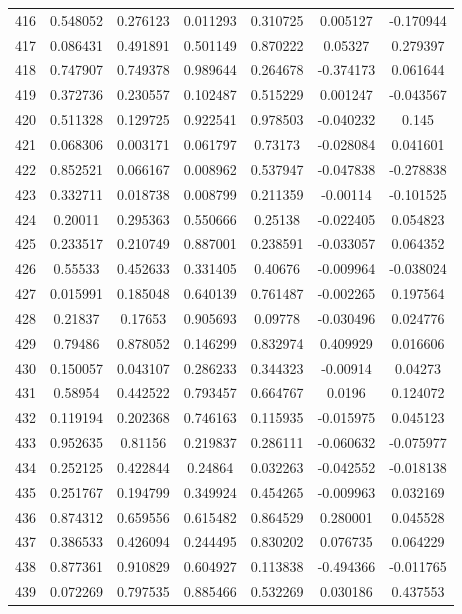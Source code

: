 \begin{table}
\begin{tabular}{c|c|c|c|c|c|c}
416 & 0.548052 & 0.276123 & 0.011293 & 0.310725 & 0.005127 & -0.170944\\
417 & 0.086431 & 0.491891 & 0.501149 & 0.870222 & 0.05327 & 0.279397\\
418 & 0.747907 & 0.749378 & 0.989644 & 0.264678 & -0.374173 & 0.061644\\
419 & 0.372736 & 0.230557 & 0.102487 & 0.515229 & 0.001247 & -0.043567\\
420 & 0.511328 & 0.129725 & 0.922541 & 0.978503 & -0.040232 & 0.145\\
421 & 0.068306 & 0.003171 & 0.061797 & 0.73173 & -0.028084 & 0.041601\\
422 & 0.852521 & 0.066167 & 0.008962 & 0.537947 & -0.047838 & -0.278838\\
423 & 0.332711 & 0.018738 & 0.008799 & 0.211359 & -0.00114 & -0.101525\\
424 & 0.20011 & 0.295363 & 0.550666 & 0.25138 & -0.022405 & 0.054823\\
425 & 0.233517 & 0.210749 & 0.887001 & 0.238591 & -0.033057 & 0.064352\\
426 & 0.55533 & 0.452633 & 0.331405 & 0.40676 & -0.009964 & -0.038024\\
427 & 0.015991 & 0.185048 & 0.640139 & 0.761487 & -0.002265 & 0.197564\\
428 & 0.21837 & 0.17653 & 0.905693 & 0.09778 & -0.030496 & 0.024776\\
429 & 0.79486 & 0.878052 & 0.146299 & 0.832974 & 0.409929 & 0.016606\\
430 & 0.150057 & 0.043107 & 0.286233 & 0.344323 & -0.00914 & 0.04273\\
431 & 0.58954 & 0.442522 & 0.793457 & 0.664767 & 0.0196 & 0.124072\\
432 & 0.119194 & 0.202368 & 0.746163 & 0.115935 & -0.015975 & 0.045123\\
433 & 0.952635 & 0.81156 & 0.219837 & 0.286111 & -0.060632 & -0.075977\\
434 & 0.252125 & 0.422844 & 0.24864 & 0.032263 & -0.042552 & -0.018138\\
435 & 0.251767 & 0.194799 & 0.349924 & 0.454265 & -0.009963 & 0.032169\\
436 & 0.874312 & 0.659556 & 0.615482 & 0.864529 & 0.280001 & 0.045528\\
437 & 0.386533 & 0.426094 & 0.244495 & 0.830202 & 0.076735 & 0.064229\\
438 & 0.877361 & 0.910829 & 0.604927 & 0.113838 & -0.494366 & -0.011765\\
439 & 0.072269 & 0.797535 & 0.885466 & 0.532269 & 0.030186 & 0.437553\\

\end{tabular}
\end{table}
